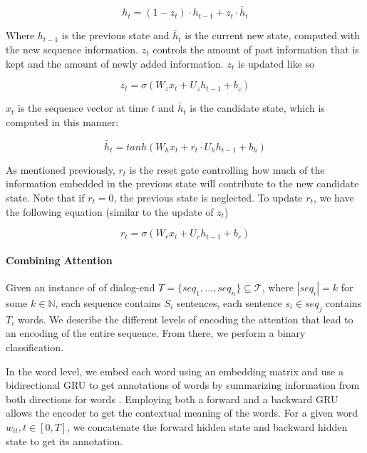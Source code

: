 \begin{equation*}
	h_t = (1-z_t)\cdot h_{t-1} + z_t \cdot \widetilde{h_t}
\end{equation*}

Where $h_{t-1}$ is the previous state and $\widetilde{h_t}$ 
is the current new state, computed with the new sequence information. 
$z_t$ controls the amount of past information that is kept 
and the amount of newly added information. $z_t$ is updated like so

\begin{equation*}
	z_t = \sigma(W_z x_t + U_z h_{t-1} + b_z)
\end{equation*}

$x_t$ is the sequence vector at time $t$ and 
$\widetilde{h_t}$ is the candidate state, which is 
computed in this manner: 

\begin{equation*}
	\widetilde{h_t} = tanh(W_h x_t + r_t \cdot U_h h_{t-1} + b_h)
\end{equation*}

As mentioned previously, $r_t$ is the reset gate 
controlling how much of the information embedded in 
the previous state will contribute to the new candidate state. 
Note that if $r_t = 0$, the previous state is neglected. 
To update $r_t$, we have the following equation (similar to the update of $z_t$)

\begin{equation*}
	r_t = \sigma(W_r x_t + U_r h_{t-1} + b_r)
\end{equation*}

\paragraph*{Combining Attention}
Given an instance of of dialog-end $T=\{seq_1, \ldots, seq_n\} \subseteq \mathcal{T}$, where $|seq_i| = k$ for some $k \in \mathbb{N}$, each sequence contains $S_i$ sentences, each sentence $s_i \in seq_j$ contains $T_i$ words. 
We describe the different levels of encoding the attention that lead 
to an encoding of the entire sequence. From there, we perform 
a binary classification. 

In the word level, we embed each word using an embedding matrix \cite{glove} 
and use a bidirectional GRU 
to get annotations of words by summarizing information
from both directions for words \cite{attention}. 
Employing both a forward and a backward GRU 
allows the encoder to get the contextual meaning of the words. 
For a given word $w_{it}, t\in [0,T]$, 
we concatenate the forward hidden state and
backward hidden state to get its annotation. 

